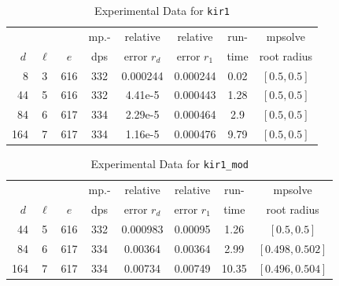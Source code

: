 \documentclass[runningheads]{llncs}
\begin{document}
\begin{table}
\caption{Experimental Data for \texttt{kir1}} %
\label{tab:kir1}
\vskip -0.15in
\begin{center}
\begin{small}
\begin{sc}
\begin{tabular}{rccccccc}
\toprule
&  &  & mp.-& relative  & relative & run- & mpsolve \\
$d~$& $\ell$& $e$ & dps&error $r_d$       & error $r_1$ &time& root radius\\
\midrule
 8 & 3 & 616 & 332 & 0.000244 & 0.000244 & 0.02 & $[0.5, 0.5]$\\ %
 44 & 5 & 616 & 332 & 4.41e-5 & 0.000443 & 1.28 & $[0.5, 0.5]$\\
  84 & 6 & 617 & 334 & 2.29e-5 & 0.000464 & 2.9 & $[0.5, 0.5]$\\
 164 & 7 & 617 & 334 & 1.16e-5 & 0.000476 & 9.79 & $[0.5, 0.5]$\\
\bottomrule
\end{tabular}
\end{sc}
\end{small}
\end{center}
\vskip 0.05in
\end{table}

\begin{table}
\caption{Experimental Data for \texttt{kir1\_mod}} %
\label{tab:kir1_mod}
\vskip -0.15in
\begin{center}
\begin{small}
\begin{sc}
\begin{tabular}{rccccccc}
\toprule
&  &  & mp.-& relative  & relative & run- & mpsolve \\
$d~$& $\ell$& $e$ & dps&error $r_d$       & error $r_1$ &time& root radius\\
\midrule
 44 & 5 & 616 & 332 & 0.000983 & 0.00095 & 1.26 & $[0.5, 0.5]$\\
 84 & 6 & 617 & 334 & 0.00364 & 0.00364 & 2.99 & $[0.498, 0.502]$\\
 164 & 7 & 617 & 334 & 0.00734 & 0.00749 & 10.35 & $[0.496, 0.504]$\\ %
\bottomrule
\end{tabular}
\end{sc}
\end{small}
\end{center}
\vskip 0.05in
\end{table}
\end{document}
